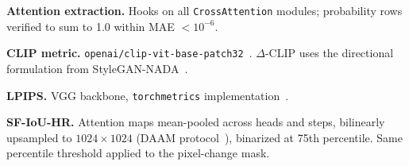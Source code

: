 \documentclass{article}
\begin{document}
\noindent\textbf{Attention extraction.}
Hooks on all \texttt{CrossAttention} modules; probability rows
verified to sum to 1.0 within MAE $< 10^{-6}$.

\noindent\textbf{CLIP metric.}
\texttt{openai/clip-vit-base-patch32}~\citep{radford2021clip}.
$\Delta$-CLIP uses the directional formulation from
StyleGAN-NADA~\citep{gal2023stylegan}.

\noindent\textbf{LPIPS.}
VGG backbone, \texttt{torchmetrics}
implementation~\citep{zhang2018lpips}.

\noindent\textbf{SF-IoU-HR.}
Attention maps mean-pooled across heads and steps, bilinearly
upsampled to $1024\!\times\!1024$ (DAAM
protocol~\citep{tang2023daam}), binarized at 75th percentile.
Same percentile threshold applied to the pixel-change mask.
\end{document}
